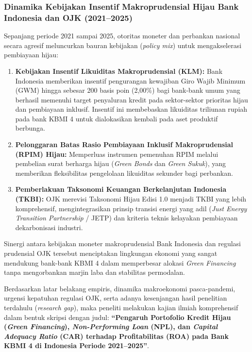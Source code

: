 \documentclass[12pt,a4paper]{article}
\numberwithin{equation}{section}
\begin{document}
\subsubsection*{Dinamika Kebijakan Insentif Makroprudensial Hijau Bank Indonesia dan OJK (2021--2025)}
\noindent
Sepanjang periode 2021 sampai 2025, otoritas moneter dan perbankan nasional secara agresif meluncurkan bauran kebijakan (\emph{policy mix}) untuk mengakselerasi pembiayaan hijau:
\begin{enumerate}
  \item \textbf{Kebijakan Insentif Likuiditas Makroprudensial (KLM):} Bank Indonesia memberikan insentif pengurangan kewajiban Giro Wajib Minimum (GWM) hingga sebesar 200 basis poin (2,00\%) bagi bank-bank umum yang berhasil memenuhi target penyaluran kredit pada sektor-sektor prioritas hijau dan pembiayaan inklusif. Insentif ini membebaskan likuiditas triliunan rupiah pada bank KBMI 4 untuk dialokasikan kembali pada aset produktif berbunga.
  \item \textbf{Pelonggaran Batas Rasio Pembiayaan Inklusif Makroprudensial (RPIM) Hijau:} Memperluas instrumen pemenuhan RPIM melalui pembelian surat berharga hijau (\emph{Green Bonds} dan \emph{Green Sukuk}), yang memberikan fleksibilitas pengelolaan likuiditas sekunder bagi perbankan.
  \item \textbf{Pemberlakuan Taksonomi Keuangan Berkelanjutan Indonesia (TKBI):} OJK merevisi Taksonomi Hijau Edisi 1.0 menjadi TKBI yang lebih komprehensif, mengintegrasikan prinsip transisi energi yang adil (\emph{Just Energy Transition Partnership} / JETP) dan kriteria teknis kelayakan pembiayaan dekarbonisasi industri.
\end{enumerate}

\noindent
Sinergi antara kebijakan moneter makroprudensial Bank Indonesia dan regulasi prudensial OJK tersebut menciptakan lingkungan ekonomi yang sangat mendukung bank-bank KBMI 4 dalam memperbesar alokasi \emph{Green Financing} tanpa mengorbankan marjin laba dan stabilitas permodalan.

\noindent
Berdasarkan latar belakang empiris, dinamika makroekonomi pasca-pandemi, urgensi kepatuhan regulasi OJK, serta adanya kesenjangan hasil penelitian terdahulu (\emph{research gap}), maka peneliti melakukan kajian ilmiah komprehensif dalam bentuk skripsi dengan judul: \textbf{``Pengaruh Portofolio Kredit Hijau (\emph{Green Financing}), \emph{Non-Performing Loan} (NPL), dan \emph{Capital Adequacy Ratio} (CAR) terhadap Profitabilitas (ROA) pada Bank KBMI 4 di Indonesia Periode 2021--2025''}.
\end{document}
